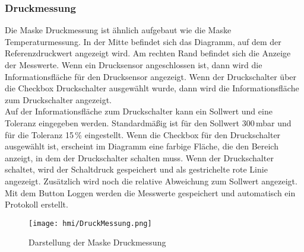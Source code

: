 \newpage
\subsubsection{Druckmessung}
Die Maske Druckmessung ist ähnlich aufgebaut wie die Maske Temperaturmessung. In der Mitte befindet sich das Diagramm, auf dem der Referenzdruckwert angezeigt wird. Am rechten Rand befindet sich die Anzeige der Messwerte. Wenn ein Drucksensor angeschlossen ist, dann wird die Informationsfläche für den Drucksensor angezeigt. Wenn der Druckschalter über die Checkbox Druckschalter ausgewählt wurde, dann wird die Informationsfläche zum Druckschalter angezeigt.
\\
Auf der Informationsfläche zum Druckschalter kann ein Sollwert und eine Toleranz eingegeben werden. Standardmäßig ist für den Sollwert 300\,mbar und für die Toleranz 15\,\% eingestellt. Wenn die Checkbox für den Druckschalter ausgewählt ist, erscheint im Diagramm eine farbige Fläche, die den Bereich anzeigt, in dem der Druckschalter schalten muss. Wenn der Druckschalter schaltet, wird der Schaltdruck gespeichert und als gestrichelte rote Linie angezeigt. Zusätzlich wird noch die relative Abweichung zum Sollwert angezeigt.
\\
Mit dem Button Loggen werden die Messwerte gespeichert und automatisch ein Protokoll erstellt.
\vspace*{\fill}
\begin{figure}[h]
\centering
\texttt{[image: hmi/DruckMessung.png]}
\caption{Darstellung der Maske Druckmessung}
\label{abbildung_druckmessung}
\end{figure}
\vspace*{4cm}

\newpage
